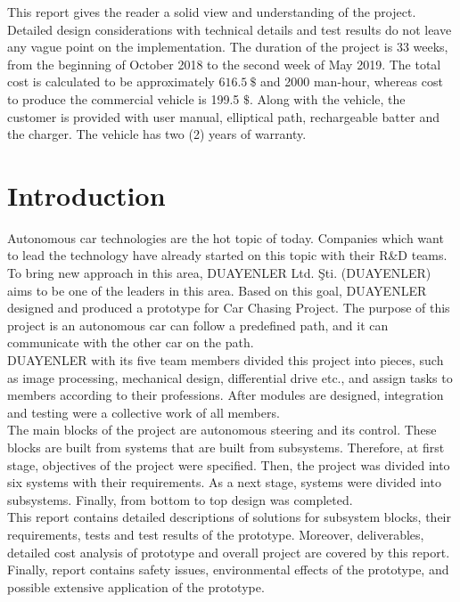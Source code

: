 \documentclass[a4paper,12pt]{article}
\begin{document}
This report gives the reader a solid view and understanding of the project. Detailed design considerations with technical details and test results do not leave any vague point on the implementation. The duration of the project is 33 weeks, from the beginning of October 2018 to the second week of May 2019. The total cost is calculated to be approximately $616.5~\$$ and  2000 man-hour, whereas cost to produce the commercial vehicle is 199.5 $\$$. Along with the vehicle, the customer is provided with user manual, elliptical path, rechargeable batter and the charger. The vehicle has two (2) years of warranty.


	\section{Introduction}

Autonomous car technologies are the hot topic of today. Companies which want to lead the technology have already started on this topic with their R\&D teams. To bring new approach in this area, DUAYENLER Ltd. Şti. (DUAYENLER) aims to be one of the leaders in this area. Based on this goal, DUAYENLER designed and produced a prototype for Car Chasing Project. The purpose of this project is an autonomous car can follow a predefined path, and it can communicate with the other car on the path.  \\

DUAYENLER with its five team members divided this project into pieces, such as image processing, mechanical design, differential drive etc., and assign tasks to members according to their professions. After modules are designed, integration and testing were a collective work of all members. \\ 

The main blocks of the project are autonomous steering and its control. These blocks are built from systems that are built from subsystems. Therefore, at first stage, objectives of the project were specified. Then, the project was divided into six systems with their requirements. As a next stage, systems were divided into subsystems. Finally, from bottom to top design was completed. \\

This report contains detailed descriptions of solutions for subsystem blocks, their requirements, tests and test results of the prototype. Moreover, deliverables, detailed cost analysis of prototype and overall project are covered by this report. Finally, report contains safety issues, environmental effects of the prototype, and possible extensive application of the prototype. 
\end{document}
